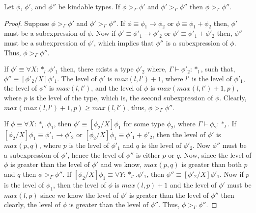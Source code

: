 \begin{lemma}
  Let $\phi$, $\phi'$, and $\phi''$ be kindable types.  If $\phi >_\Gamma \phi'$ and 
  $\phi' >_\Gamma \phi''$ then $\phi >_\Gamma \phi''$.
  \label{lemma:transitivity_ssfp}
\end{lemma}
\begin{proof}
  Suppose $\phi >_\Gamma \phi'$ and $\phi' >_\Gamma \phi''$.  If 
  $\phi \equiv \phi_1 \rightarrow \phi_2$ or $\phi \equiv \phi_1 + \phi_2$ then,
  $\phi'$ must be a subexpression of $\phi$.  Now if $\phi' \equiv \phi'_1 \rightarrow \phi'_2$ 
  or $\phi' \equiv \phi'_1 + \phi'_2$ then,
  $\phi''$ must be a subexpression of $\phi'$, which implies that $\phi''$ is a subexpression of 
  $\phi$.  Thus, $\phi >_\Gamma \phi''$.
  
  If $\phi' \equiv \forall X:*_l.\phi'_1$ then, there exists a type $\phi'_2$ where, 
  $\Gamma \vdash \phi'_2:*_l$, such that, 
  $\phi'' \equiv [\phi'_2/X]\phi'_1$.  The level of $\phi'$ is $max(l,l')+1$, where $l'$ is the 
  level of $\phi'_1$, the level of 
  $\phi''$ is $max(l,l')$, and the level of $\phi$ is $max(max(l,l')+1,p)$, where $p$ is the 
  level of the type, which is, the second subexpression of $\phi$.
  Clearly, $max(max(l,l')+1,p) \geq max(l,l')$, thus, $\phi >_\Gamma \phi''$.

  If $\phi \equiv \forall X:*_l.\phi_1$, then $\phi' \equiv [\phi_2/X]\phi_1$ for some type 
  $\phi_2$, where $\Gamma \vdash \phi_2:*_l$.  If
  $[\phi_2/X]\phi_1 \equiv \phi'_1 \rightarrow \phi'_2$ or 
  $[\phi_2/X]\phi_1 \equiv \phi'_1 + \phi'_2$, then the level of $\phi'$ is $max(p,q)$, where 
  $p$ is the level
  of $\phi'_1$ and $q$ is the level of $\phi'_2$.  Now $\phi''$ must be a subexpression of 
  $\phi'$, hence the level of $\phi''$ is either $p$ or $q$.  Now, since
  the level of $\phi$ is greater than the level of $\phi'$ and we know, $max(p,q)$ is greater 
  than both $p$ and $q$ then $\phi >_\Gamma \phi''$.  If 
  $[\phi_2/X]\phi_1 \equiv \forall Y:*_{l'}.\phi'_1$, then $\phi'' \equiv [\phi'_2/X]\phi'_1$.  
  Now if $p$ is the level of $\phi_1$, then the level of $\phi$ is
  $max(l,p)+1$ and the level of $\phi'$ must be $max(l,p)$ since we know the level of $\phi'$ is 
  greater than the level of $\phi''$ then clearly, the level of 
  $\phi$ is greater than the level of $\phi''$.  Thus, $\phi >_\Gamma \phi''$.
\end{proof}

